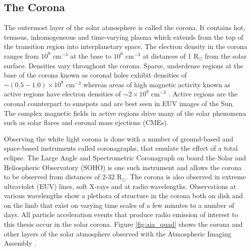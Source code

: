 \subsection{The Corona}
The outermost layer of the solar atmosphere is called the corona. It contains hot, tenuous, inhomogeneous and time-varying plasma which extends from the top of the transition region into interplanetary space.
The electron density in the corona ranges from $10^{9} \mbox{ cm}^{-3}$ at the base to $10^{6} \mbox{ cm}^{-3}$ at distances of 1 R$_{\odot}$ from the solar surface. Densities vary throughout the corona. Sparse, underdense regions at the base of the corona known as coronal holes exhibit densities of $\sim ( 0.5 - 1.0) \times 10^8 \mbox{ cm}^{-3}$ whereas areas of high magnetic activity known as active regions have electron densities of $\sim 2 \times 10^9 \mbox{ cm}^{-3}$ \citep{Aschwanden2004}. Active regions are the coronal counterpart to sunspots and are best seen in EUV images of the Sun. The complex magnetic fields in active regions drive many of the solar phenomena such as solar flares and coronal mass ejections (CMEs).

Observing the white light corona is done with a number of ground-based and space-based instruments called coronagraphs, that emulate the effect of a total eclipse. The Large Angle and Spectrometric Coronagraph \citep[LASCO;][]{Brueckner1995} on board the Solar and Heliospheric Observatory (SOHO) is one such instrument and allows the corona to be observed from distances of 2-32 R$_\odot$. The corona is also observed in extreme ultraviolet (EUV) lines, soft X-rays and at radio wavelengths. Observations at various wavelengths show a plethora of structure in the corona both on disk and on the limb that exist on varying time scales of a few minutes to a number of days. All particle acceleration events that produce radio emission of interest to this thesis occur in the solar corona. Figure \ref{fig:aia_quad} shows the corona and other layers of the solar atmosphere observed with the Atmospheric Imaging Assembly \citep[AIA;][]{Lemen2012}.

